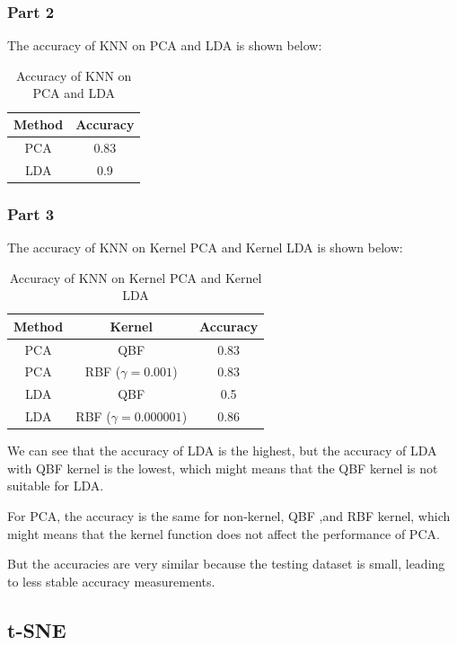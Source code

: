 \documentclass{homework}
\begin{document}
\subsubsection{Part 2}

The accuracy of KNN on PCA and LDA is shown below:

\begin{table}[H]
    \centering
    \begin{tabular}{|c|c|}
        \hline
        Method & Accuracy \\
        \hline
        PCA & 0.83 \\
        LDA & 0.9 \\
        \hline
    \end{tabular}
    \caption{Accuracy of KNN on PCA and LDA}
\end{table}

\subsubsection{Part 3}

The accuracy of KNN on Kernel PCA and Kernel LDA is shown below:

\begin{table}[H]
    \centering
    \begin{tabular}{|c|c|c|}
        \hline
        Method & Kernel & Accuracy \\
        \hline
        PCA & QBF & 0.83 \\
        PCA & RBF ($\gamma=0.001$) & 0.83 \\
        LDA & QBF & 0.5 \\
        LDA & RBF ($\gamma=0.000001$) & 0.86 \\
        \hline
    \end{tabular}
    \caption{Accuracy of KNN on Kernel PCA and Kernel LDA}
\end{table}

We can see that the accuracy of LDA is the highest, but the accuracy of LDA with QBF kernel is the lowest, which might means that the QBF kernel is not suitable for LDA.

For PCA, the accuracy is the same for non-kernel, QBF ,and RBF kernel, which might means that the kernel function does not affect the performance of PCA.

But the accuracies are very similar because the testing dataset is small, leading to less stable accuracy measurements.

\subsection{t-SNE}
\end{document}

